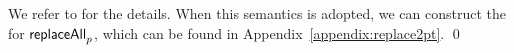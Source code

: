 \begin{example}
     We refer to \cite{CCHLW18} for the details. When this semantics is adopted, we can construct the \PPT{} for $\mathsf{replaceAll}_{p}$, which can be found in Appendix~\ref{appendix:replace2pt}.     \qed
%    
%    
%

    

\end{example}

%



